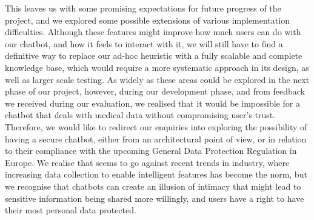 This leaves us with some promising expectations for future progress of the project, and we explored some possible extensions of various implementation difficulties. Although these features might improve how much users can do with our chatbot, and how it feels to interact with it, we will still have to find a definitive way to replace our ad-hoc heuristic with a fully scalable and complete knowledge base, which would require a more systematic approach in its design, as well as larger scale testing. As widely as these areas could be explored in the next phase of our project, however, during our development phase, and from feedback we received during our evaluation, we realised that it would be impossible for a chatbot that deals with medical data without compromising user's trust. Therefore, we would like to redirect our enquiries into exploring the possibility of having a secure chatbot, either from an architectural point of view, or in relation to their compliance with the upcoming General Data Protection Regulation in Europe. We realise that seems to go against recent trends in industry, where increasing data collection to enable intelligent features has become the norm, but we recognise that chatbots can create an illusion of intimacy that might lead to sensitive information being shared more willingly, and users have a right to have their most personal data protected.
